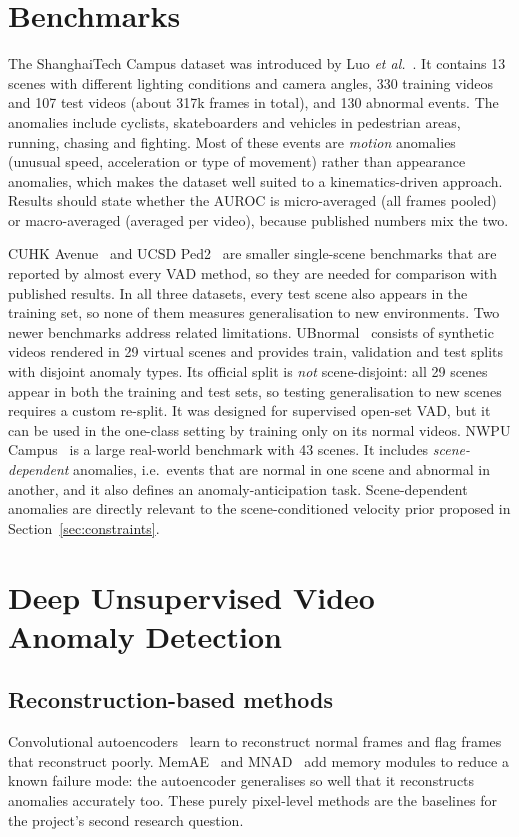 \documentclass[11pt,a4paper]{article}
\begin{document}
\section{Benchmarks}
The ShanghaiTech Campus dataset was introduced by Luo \emph{et al.}~\cite{luo2017revisit}. It contains 13 scenes with different lighting conditions and camera angles, 330 training videos and 107 test videos (about 317k frames in total), and 130 abnormal events. The anomalies include cyclists, skateboarders and vehicles in pedestrian areas, running, chasing and fighting. Most of these events are \emph{motion} anomalies (unusual speed, acceleration or type of movement) rather than appearance anomalies, which makes the dataset well suited to a kinematics-driven approach. Results should state whether the AUROC is micro-averaged (all frames pooled) or macro-averaged (averaged per video), because published numbers mix the two.

CUHK Avenue~\cite{lu2013abnormal} and UCSD Ped2~\cite{mahadevan2010anomaly} are smaller single-scene benchmarks that are reported by almost every VAD method, so they are needed for comparison with published results. In all three datasets, every test scene also appears in the training set, so none of them measures generalisation to new environments. Two newer benchmarks address related limitations. UBnormal~\cite{acsintoae2022ubnormal} consists of synthetic videos rendered in 29 virtual scenes and provides train, validation and test splits with disjoint anomaly types. Its official split is \emph{not} scene-disjoint: all 29 scenes appear in both the training and test sets, so testing generalisation to new scenes requires a custom re-split. It was designed for supervised open-set VAD, but it can be used in the one-class setting by training only on its normal videos. NWPU Campus~\cite{cao2023new} is a large real-world benchmark with 43 scenes. It includes \emph{scene-dependent} anomalies, i.e.\ events that are normal in one scene and abnormal in another, and it also defines an anomaly-anticipation task. Scene-dependent anomalies are directly relevant to the scene-conditioned velocity prior proposed in Section~\ref{sec:constraints}.

\section{Deep Unsupervised Video Anomaly Detection}

\subsection{Reconstruction-based methods}
Convolutional autoencoders~\cite{hasan2016learning} learn to reconstruct normal frames and flag frames that reconstruct poorly. MemAE~\cite{gong2019memorizing} and MNAD~\cite{park2020learning} add memory modules to reduce a known failure mode: the autoencoder generalises so well that it reconstructs anomalies accurately too. These purely pixel-level methods are the baselines for the project's second research question.
\end{document}
